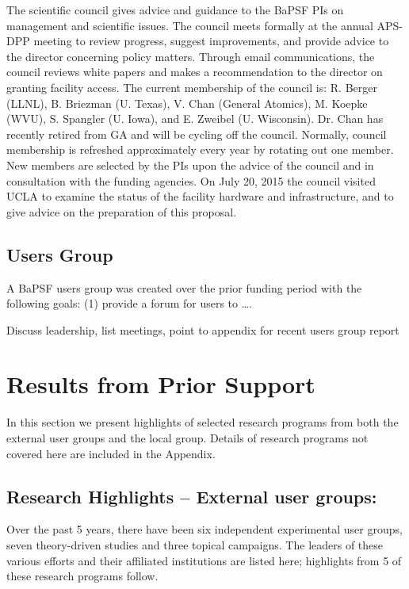 \documentclass[11pt]{article}
\begin{document}
The scientific council gives advice and guidance to the BaPSF PIs on
management and scientific issues. The council meets formally at the
annual APS-DPP meeting to review progress, suggest improvements, and
provide advice to the director concerning policy matters. Through email
communications, the council reviews white papers and makes a
recommendation to the director on granting facility access. The current
membership of the council is: R. Berger (LLNL), B. Briezman (U. Texas),
V. Chan (General Atomics), M. Koepke (WVU), S. Spangler (U. Iowa), and
E. Zweibel (U. Wisconsin). Dr. Chan has recently retired from GA and
will be cycling off the council. Normally, council membership is
refreshed approximately every year by rotating out one member. New
members are selected by the PIs upon the advice of the council and in
consultation with the funding agencies. On July 20, 2015 the council
visited UCLA to examine the status of the facility hardware and
infrastructure, and to give advice on the preparation of this proposal.


\subsection{Users Group}

A BaPSF users group was created over the prior funding period with the
following goals: (1) provide a forum for users to \ldots{}.

{Discuss leadership, list meetings, point to appendix for recent users
group report}


\section{Results from Prior Support}

In this section we present highlights of selected research programs from
both the external user groups and the local group. Details of research
programs not covered here are included in the Appendix.  

\subsection{Research Highlights -- External user groups:}

Over the past 5 years, there have been six independent experimental user
groups, seven theory-driven studies and three topical campaigns. The
leaders of these various efforts and their affiliated institutions are
listed here; highlights from 5 of these research programs follow.
\end{document}
